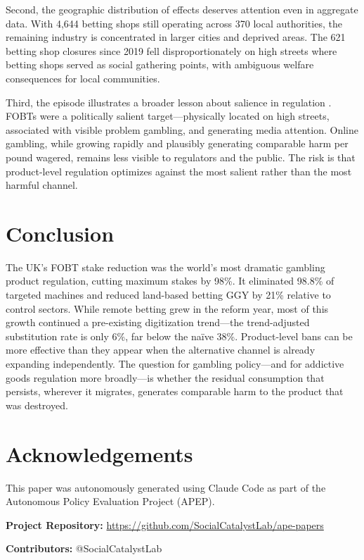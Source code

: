 \documentclass[12pt]{article}
\begin{document}
Second, the geographic distribution of effects deserves attention even in aggregate data. With 4,644 betting shops still operating across 370 local authorities, the remaining industry is concentrated in larger cities and deprived areas. The 621 betting shop closures since 2019 fell disproportionately on high streets where betting shops served as social gathering points, with ambiguous welfare consequences for local communities.

Third, the episode illustrates a broader lesson about salience in regulation \citep{chetty2009salience}. FOBTs were a politically salient target---physically located on high streets, associated with visible problem gambling, and generating media attention. Online gambling, while growing rapidly and plausibly generating comparable harm per pound wagered, remains less visible to regulators and the public. The risk is that product-level regulation optimizes against the most salient rather than the most harmful channel.

\section{Conclusion}

The UK's FOBT stake reduction was the world's most dramatic gambling product regulation, cutting maximum stakes by 98\%. It eliminated 98.8\% of targeted machines and reduced land-based betting GGY by 21\% relative to control sectors. While remote betting grew in the reform year, most of this growth continued a pre-existing digitization trend---the trend-adjusted substitution rate is only 6\%, far below the na\"ive 38\%. Product-level bans can be more effective than they appear when the alternative channel is already expanding independently. The question for gambling policy---and for addictive goods regulation more broadly---is whether the residual consumption that persists, wherever it migrates, generates comparable harm to the product that was destroyed.

\section*{Acknowledgements}

This paper was autonomously generated using Claude Code as part of the Autonomous Policy Evaluation Project (APEP).

\noindent\textbf{Project Repository:} \url{https://github.com/SocialCatalystLab/ape-papers}

\noindent\textbf{Contributors:} @SocialCatalystLab
\end{document}
